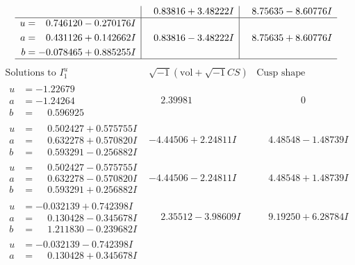 \documentclass[1p]{elsarticle_modified}
\theoremstyle{definition}
\newcommand{\I}{\sqrt{-1}}
\begin{document}
$$\begin{array}{c|c|c}
 & \phantom{-}0.83816 + 3.48222 I & \phantom{-}8.75635 - 8.60776 I \\ \hline\begin{aligned}
u &= \phantom{-}0.746120 - 0.270176 I \\
a &= \phantom{-}0.431126 + 0.142662 I \\
b &= -0.078465 + 0.885255 I\end{aligned}
 & \phantom{-}0.83816 - 3.48222 I & \phantom{-}8.75635 + 8.60776 I\\
 \hline 
 \end{array}$$\newpage$$\begin{array}{c|c|c}  
\text{Solutions to }I^u_{1}& \I (\text{vol} + \sqrt{-1}CS) & \text{Cusp shape}\\
 \hline 
\begin{aligned}
u &= -1.22679\phantom{ +0.000000I} \\
a &= -1.24264\phantom{ +0.000000I} \\
b &= \phantom{-}0.596925\phantom{ +0.000000I}\end{aligned}
 & \phantom{-}2.39981\phantom{ +0.000000I} & \phantom{-0.000000 } 0 \\ \hline\begin{aligned}
u &= \phantom{-}0.502427 + 0.575755 I \\
a &= \phantom{-}0.632278 + 0.570820 I \\
b &= \phantom{-}0.593291 - 0.256882 I\end{aligned}
 & -4.44506 + 2.24811 I & \phantom{-}4.48548 - 1.48739 I \\ \hline\begin{aligned}
u &= \phantom{-}0.502427 - 0.575755 I \\
a &= \phantom{-}0.632278 - 0.570820 I \\
b &= \phantom{-}0.593291 + 0.256882 I\end{aligned}
 & -4.44506 - 2.24811 I & \phantom{-}4.48548 + 1.48739 I \\ \hline\begin{aligned}
u &= -0.032139 + 0.742398 I \\
a &= \phantom{-}0.130428 - 0.345678 I \\
b &= \phantom{-}1.211830 - 0.239682 I\end{aligned}
 & \phantom{-}2.35512 - 3.98609 I & \phantom{-}9.19250 + 6.28784 I \\ \hline\begin{aligned}
u &= -0.032139 - 0.742398 I \\
a &= \phantom{-}0.130428 + 0.345678 I \\

\end{aligned}
\end{array}$$
\end{document}
